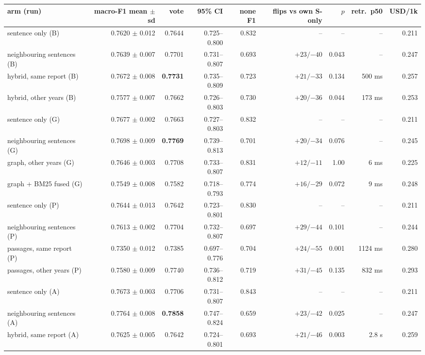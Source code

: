 \documentclass[11pt]{article}
\begin{document}
\begin{table}[!htbp]
\centering\scriptsize
\setlength{\tabcolsep}{3.5pt}
\begin{tabular*}{\linewidth}{@{}@{\extracolsep{\fill}}lrrrrrrrr@{}}
\toprule
arm (run) & macro-F1 mean $\pm$ sd & vote & 95\% CI & none F1 & flips vs own S-only & $p$ & retr.\ p50 & USD/1k \\
\midrule
sentence only (B) & 0.7620 $\pm$ 0.012 & 0.7644 & 0.725--0.800 & 0.832 & -- & -- & -- & 0.211 \\
neighbouring sentences (B) & 0.7639 $\pm$ 0.007 & 0.7701 & 0.731--0.807 & 0.693 & $+23 / {-40}$ & 0.043 & -- & 0.247 \\
hybrid, same report (B) & 0.7672 $\pm$ 0.008 & \textbf{0.7731} & 0.735--0.809 & 0.723 & $+21 / {-33}$ & 0.134 & 500 ms & 0.257 \\
hybrid, other years (B) & 0.7577 $\pm$ 0.007 & 0.7662 & 0.726--0.803 & 0.730 & $+20 / {-36}$ & 0.044 & 173 ms & 0.253 \\
sentence only (G) & 0.7677 $\pm$ 0.002 & 0.7663 & 0.727--0.803 & 0.832 & -- & -- & -- & 0.211 \\
neighbouring sentences (G) & 0.7698 $\pm$ 0.009 & \textbf{0.7769} & 0.739--0.813 & 0.701 & $+20 / {-34}$ & 0.076 & -- & 0.245 \\
graph, other years (G) & 0.7646 $\pm$ 0.003 & 0.7708 & 0.733--0.807 & 0.831 & $+12 / {-11}$ & 1.00 & 6 ms & 0.225 \\
graph + BM25 fused (G) & 0.7549 $\pm$ 0.008 & 0.7582 & 0.718--0.793 & 0.774 & $+16 / {-29}$ & 0.072 & 9 ms & 0.248 \\
\midrule
sentence only (P) & 0.7644 $\pm$ 0.013 & 0.7642 & 0.723--0.801 & 0.830 & -- & -- & -- & 0.211 \\
neighbouring sentences (P) & 0.7613 $\pm$ 0.002 & 0.7704 & 0.732--0.807 & 0.697 & $+29 / {-44}$ & 0.101 & -- & 0.244 \\
passages, same report (P) & 0.7350 $\pm$ 0.012 & 0.7385 & 0.697--0.776 & 0.704 & $+24 / {-55}$ & 0.001 & 1124 ms & 0.280 \\
passages, other years (P) & 0.7580 $\pm$ 0.009 & 0.7740 & 0.736--0.812 & 0.719 & $+31 / {-45}$ & 0.135 & 832 ms & 0.293 \\
\midrule
sentence only (A) & 0.7673 $\pm$ 0.003 & 0.7706 & 0.731--0.807 & 0.843 & -- & -- & -- & 0.211 \\
neighbouring sentences (A) & 0.7764 $\pm$ 0.008 & \textbf{0.7858} & 0.747--0.824 & 0.659 & $+23 / {-42}$ & 0.025 & -- & 0.247 \\
hybrid, same report (A) & 0.7625 $\pm$ 0.005 & 0.7642 & 0.724--0.801 & 0.693 & $+21 / {-46}$ & 0.003 & 2.8 s & 0.259 \\

\end{tabular*}
\end{table}
\end{document}
